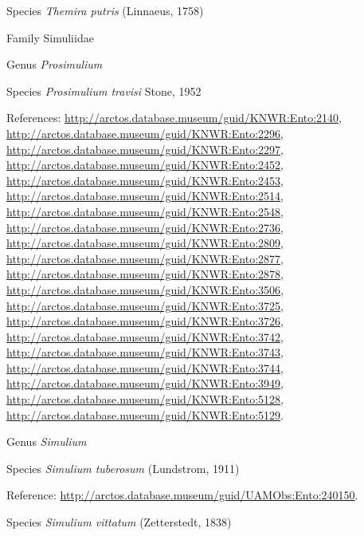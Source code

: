 \documentclass[9pt, article]{memoir}
\begin{document}
\begin{multicols}{2}
\vspace{6pt}\noindent\hspace{36pt}Species \textit{Themira putris} (Linnaeus, 1758)


\vspace{6pt}\noindent\hspace{24pt}Family Simuliidae


\vspace{6pt}\noindent\hspace{30pt}Genus \textit{Prosimulium}


\vspace{6pt}\noindent\hspace{36pt}Species \textit{Prosimulium travisi} Stone, 1952


\vspace{6pt}References: 
\url{http://arctos.database.museum/guid/KNWR:Ento:2140}, 
\url{http://arctos.database.museum/guid/KNWR:Ento:2296}, 
\url{http://arctos.database.museum/guid/KNWR:Ento:2297}, 
\url{http://arctos.database.museum/guid/KNWR:Ento:2452}, 
\url{http://arctos.database.museum/guid/KNWR:Ento:2453}, 
\url{http://arctos.database.museum/guid/KNWR:Ento:2514}, 
\url{http://arctos.database.museum/guid/KNWR:Ento:2548}, 
\url{http://arctos.database.museum/guid/KNWR:Ento:2736}, 
\url{http://arctos.database.museum/guid/KNWR:Ento:2809}, 
\url{http://arctos.database.museum/guid/KNWR:Ento:2877}, 
\url{http://arctos.database.museum/guid/KNWR:Ento:2878}, 
\url{http://arctos.database.museum/guid/KNWR:Ento:3506}, 
\url{http://arctos.database.museum/guid/KNWR:Ento:3725}, 
\url{http://arctos.database.museum/guid/KNWR:Ento:3726}, 
\url{http://arctos.database.museum/guid/KNWR:Ento:3742}, 
\url{http://arctos.database.museum/guid/KNWR:Ento:3743}, 
\url{http://arctos.database.museum/guid/KNWR:Ento:3744}, 
\url{http://arctos.database.museum/guid/KNWR:Ento:3949}, 
\url{http://arctos.database.museum/guid/KNWR:Ento:5128}, 
\url{http://arctos.database.museum/guid/KNWR:Ento:5129}.

\vspace{6pt}\noindent\hspace{30pt}Genus \textit{Simulium}


\vspace{6pt}\noindent\hspace{36pt}Species \textit{Simulium tuberosum} (Lundstrom, 1911)


\vspace{6pt}Reference: 
\url{http://arctos.database.museum/guid/UAMObs:Ento:240150}.

\vspace{6pt}\noindent\hspace{36pt}Species \textit{Simulium vittatum} (Zetterstedt, 1838)



\end{multicols}
\end{document}
